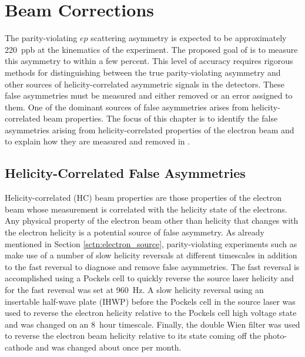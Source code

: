 
\chapter{Beam Corrections} 
\captionsetup{justification=justified,singlelinecheck=false}

\label{Chapter4}


The parity-violating $ep$ scattering asymmetry is expected to be approximately 220~ppb at the kinematics of the \Qs experiment. The proposed goal of \Qs is to measure this asymmetry to within a few percent. This level of accuracy requires rigorous methods for distinguishing between the true parity-violating asymmetry and other sources of helicity-correlated asymmetric signals in the detectors. These false asymmetries must be measured and either removed or an error assigned to them. One of the dominant sources of false asymmetries arises from helicity-correlated beam properties. The focus of this chapter is to identify the false asymmetries arising from helicity-correlated properties of the electron beam and to explain how they are measured and removed in \Q.    

\section{Helicity-Correlated False Asymmetries}
Helicity-correlated (HC) beam properties are those properties of the electron beam whose measurement is correlated with the helicity state of the electrons. Any physical property of the electron beam other than helicity that changes with the electron helicity is a potential source of false asymmetry. As already mentioned in Section \ref{sctn:electron_source}, parity-violating experiments such as \Qs make use of a number of slow helicity reversals at different timescales in addition to the fast reversal to diagnose and remove false asymmetries. The fast reversal is accomplished using a Pockels cell to quickly reverse the source laser helicity and for \Qs the fast reversal was set at 960~Hz. A slow helicity reversal using an insertable half-wave plate (IHWP) before the Pockels cell in the source laser was used to reverse the electron helicity relative to the Pockels cell high voltage state and was changed on an 8~hour timescale. Finally, the double Wien filter was used to reverse the electron beam helicity relative to its state coming off the photo-cathode and was changed about once per month. 

